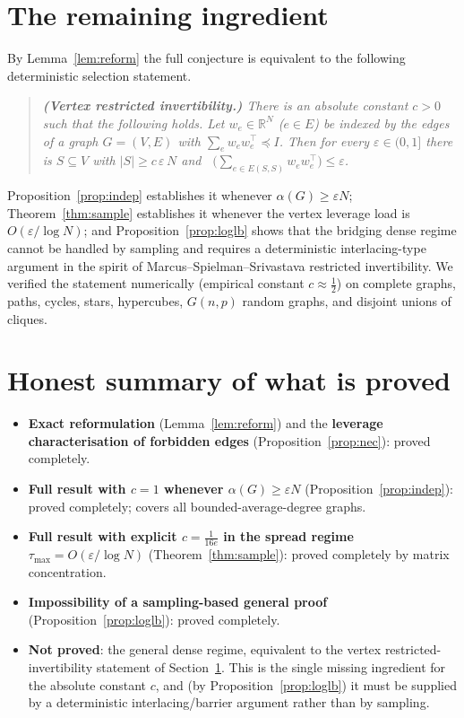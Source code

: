 \documentclass[12pt]{article}
\DeclareMathOperator*{\lammax}{\lambda_{\max}}
\newcommand{\bR}{\mathbb{R}}
\newcommand{\eps}{\varepsilon}
\theoremstyle{definition}
\begin{document}
\section{The remaining ingredient}\label{sec:remaining}

By Lemma~\ref{lem:reform} the full conjecture is equivalent to the following
deterministic selection statement.

\begin{quote}\itshape
\textbf{(Vertex restricted invertibility.)} There is an absolute constant $c>0$
such that the following holds. Let $w_e\in\bR^N$ ($e\in E$) be indexed by the
edges of a graph $G=(V,E)$ with $\sum_e w_ew_e^{\top}\preceq I$. Then for every
$\eps\in(0,1]$ there is $S\subseteq V$ with $|S|\ge c\,\eps\,N$ and
$\lammax\big(\sum_{e\in E(S,S)}w_ew_e^{\top}\big)\le\eps$.
\end{quote}

Proposition~\ref{prop:indep} establishes it whenever $\alpha(G)\ge\eps N$;
Theorem~\ref{thm:sample} establishes it whenever the vertex leverage load is
$O(\eps/\log N)$; and Proposition~\ref{prop:loglb} shows that the bridging dense
regime cannot be handled by sampling and requires a deterministic
interlacing-type argument in the spirit of Marcus--Spielman--Srivastava
restricted invertibility. We verified the statement numerically (empirical
constant $c\approx\tfrac12$) on complete graphs, paths, cycles, stars,
hypercubes, $G(n,p)$ random graphs, and disjoint unions of cliques.

\section*{Honest summary of what is proved}
\begin{itemize}
\item \textbf{Exact reformulation} (Lemma~\ref{lem:reform}) and the
\textbf{leverage characterisation of forbidden edges} (Proposition~\ref{prop:nec}):
proved completely.
\item \textbf{Full result with $c=1$ whenever $\alpha(G)\ge\eps N$}
(Proposition~\ref{prop:indep}): proved completely; covers all bounded-average-degree
graphs.
\item \textbf{Full result with explicit $c=\tfrac{1}{16e}$ in the spread regime
$\tau_{\max}=O(\eps/\log N)$} (Theorem~\ref{thm:sample}): proved completely by
matrix concentration.
\item \textbf{Impossibility of a sampling-based general proof}
(Proposition~\ref{prop:loglb}): proved completely.
\item \textbf{Not proved}: the general dense regime, equivalent to the vertex
restricted-invertibility statement of Section~\ref{sec:remaining}. This is the
single missing ingredient for the absolute constant $c$, and (by
Proposition~\ref{prop:loglb}) it must be supplied by a deterministic
interlacing/barrier argument rather than by sampling.
\end{itemize}
\end{document}

